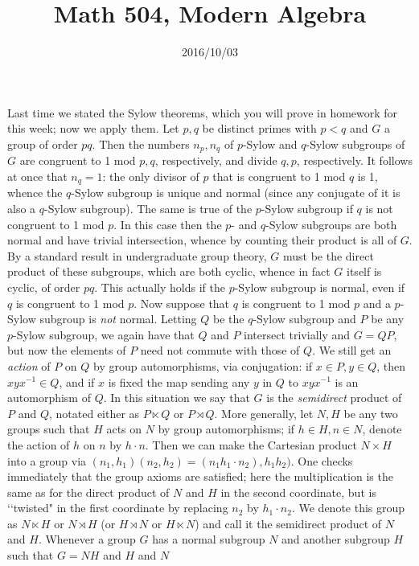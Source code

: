 \documentclass[10pt]{article} \usepackage{amsmath, amssymb}
\title{Math 504, Modern Algebra} \date{2016/10/03}
\begin{document}
\maketitle

Last time we stated the Sylow theorems, which you will prove in homework
for this week; now we apply them. Let $p,q$ be distinct primes with
$p<q$ and $G$ a group of order $pq$. Then the numbers $n_p,n_q$ of
$p$-Sylow and $q$-Sylow subgroups of $G$ are congruent to 1 mod $p,q$,
respectively, and divide $q,p$, respectively. It follows at once that
$n_q = 1$: the only divisor of $p$ that is congruent to 1 mod $q$ is 1,
whence the $q$-Sylow subgroup is unique and normal (since any conjugate
of it is also a $q$-Sylow subgroup). The same is true of the $p$-Sylow
subgroup if $q$ is not congruent to 1 mod $p$. In this case then the
$p$- and $q$-Sylow subgroups are both normal and have trivial
intersection, whence by counting their product is all of $G$. By a
standard result in undergraduate group theory, $G$ must be the direct
product of these subgroups, which are both cyclic, whence in fact $G$
itself is cyclic, of order $pq$. This actually holds if the $p$-Sylow
subgroup is normal, even if $q$ is congruent to 1 mod $p$. Now suppose
that $q$ is congruent to 1 mod $p$ and a $p$-Sylow subgroup is {\sl not}
normal. Letting $Q$ be the $q$-Sylow subgroup and $P$ be any $p$-Sylow
subgroup, we again have that $Q$ and $P$ intersect trivially and $G =
QP$, but now the elements of $P$ need not commute with those of $Q$. We
still get an {\sl action} of $P$ on $Q$ by group automorphisms, via
conjugation: if $x\in P,y\in Q$, then $xyx^{-1}\in Q$, and if $x$ is
fixed the map sending any $y$ in $Q$ to $xyx^{-1}$ is an automorphism of
$Q$. In this situation we say that $G$ is the {\sl semidirect} product
of $P$ and $Q$, notated either as $P\ltimes Q$ or $P\rtimes Q$. More
generally, let $N,H$ be any two groups such that $H$ acts on $N$ by
group automorphisms; if $h\in H,n\in N$, denote the action of $h$ on $n$
by $h\cdot n$. Then we can make the Cartesian product $N\times H$ into a
group via $(n_1,h_1) (n_2,h_2) = (n_1 h_1\cdot n_2),h_1 h_2)$. One
checks immediately that the group axioms are satisfied; here the
multiplication is the same as for the direct product of $N$ and $H$ in
the second coordinate, but is \lq\lq twisted" in the first coordinate by
replacing $n_2$ by $h_1\cdot n_2$. We denote this group as $N\ltimes H$
or $N\rtimes H$ (or $H\rtimes N$ or $H\ltimes N$) and call it the
semidirect product of $N$ and $H$. Whenever a group $G$ has a normal
subgroup $N$ and another subgroup $H$ such that $G = NH$ and $H$ and $N$
\end{document}
